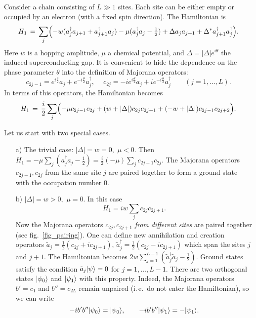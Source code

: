 Consider a chain consisting of $L\gg 1$ sites. Each site can be either
empty or occupied by an electron (with a fixed spin direction).  The
Hamiltonian is
\begin{equation}\label{the_model}
H_1\,=\, \sum_j \Bigl( -w(a_j^\dagger a_{j+1}+a_{j+1}^\dagger a_j)
-\mu(a_j^\dagger a_j-{\textstyle\frac{1}{2}})
+\Delta a_ja_{j+1}+\Delta^* a_{j+1}^\dagger a_j^\dagger \Bigr).
\end{equation}
Here $w$ is a hopping amplitude, $\mu$ a chemical potential, and
$\Delta=|\Delta|e^{i\theta}$ the induced superconducting gap. It is convenient
to hide the dependence on the phase parameter $\theta$ into the definition of
Majorana operators:
\begin{equation}\label{Majorana}
c_{2j-1}=e^{i\frac{\theta}{2}}a_j+e^{-i\frac{\theta}{2}}a_j^\dagger, \quad\
c_{2j}=-ie^{i\frac{\theta}{2}}a_j+ie^{-i\frac{\theta}{2}}a_j^\dagger
\qquad (j=1,\ldots,L).
\end{equation}
In terms of this operators, the Hamiltonian becomes
\begin{equation}\label{the_model_Majorana}
H_1\,=\, \frac{i}{2} \sum_j \Bigl( -\mu c_{2j-1}c_{2j}
+(w+|\Delta|)c_{2j}c_{2j+1}+(-w+|\Delta|)c_{2j-1}c_{2j+2} \Bigr).
\end{equation}

Let us start with two special cases.
\begin{itemize}
\item[a)] The trivial case: $|\Delta|=w=0$,\, $\mu<0$. Then $H_1=-\mu\sum_j
(a_j^\dagger a_j-\frac{1}{2})=\frac{i}{2}(-\mu)\sum_j c_{2j-1}c_{2j}$. The
Majorana operators $c_{2j-1},c_{2j}$ from the same site $j$ are paired
together to form a ground state with the occupation number $0$.
\item[b)] $|\Delta|=w>0$,\, $\mu=0$. In this case
\begin{equation}
H_1=iw\sum_j c_{2j}c_{2j+1}.
\end{equation}
Now the Majorana operators $c_{2j},c_{2j+1}$ {\em from different sites} are
paired together (see fig.~\ref{fig_pairing}). One can define new annihilation
and creation operators $\tilde a_j=\frac{1}{2}(c_{2j}+ic_{2j+1}),\, \tilde
a_j^\dagger=\frac{1}{2}(c_{2j}-ic_{2j+1})$ which span the sites $j$ and
$j+1$. The Hamiltonian becomes $2w\sum_{j=1}^{L-1}(\tilde a_j^\dagger\tilde
a_j-\frac{1}{2})$. Ground states satisfy the condition $\tilde
a_j|\psi\rangle=0$ for $j=1,\ldots,L-1$. There are two orthogonal states
$|\psi_0\rangle$ and $|\psi_1\rangle$ with this property. Indeed, the Majorana
operators $b'=c_1$ and $b''=c_{2L}$ remain unpaired (i.\,e.\ do not enter the
Hamiltonian), so we can write
\begin{equation}\label{ground_states}
-ib'b''|\psi_0\rangle=|\psi_0\rangle,\qquad -ib'b''|\psi_1\rangle=-|\psi_1\rangle.
\end{equation}
\end{itemize}
\vspace{-7mm}

